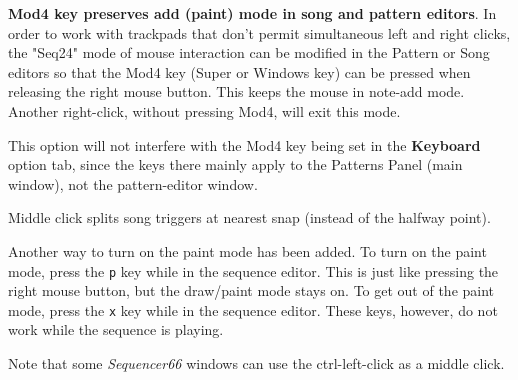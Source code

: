 
   \label{new_mod4_mode}
   \textbf{Mod4 key preserves add (paint) mode in song and pattern editors}.
   In order to work with trackpads that don't permit simultaneous left
   and right clicks, the
   "Seq24" mode of mouse interaction can be modified in the
   Pattern or Song editors so that the Mod4 key (Super or Windows key)
   can be pressed when releasing the right mouse button.
   This keeps the mouse in note-add mode.
   Another right-click, without pressing Mod4, will exit this mode.


   This option will not interfere with the Mod4 key being set
   in the \textbf{Keyboard} option tab, since the keys there mainly apply to
   the Patterns Panel (main window), not the pattern-editor window.

   \label{new_split_mode}
   Middle click splits song triggers at nearest snap (instead of
   the halfway point).

   Another way to turn on the paint mode has been added.
   To turn on the paint mode, press the
   \texttt{p} key while in the sequence editor.
   This is just like pressing the right mouse button, but the draw/paint mode
   stays on.
   To get out of the paint mode, press the
   \texttt{x} key while in the sequence editor.
   These keys, however, do not work while the sequence is playing.

   Note that some \textsl{Sequencer66} windows
   can use the ctrl-left-click as a middle click. 
 
